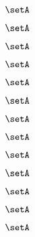 \begin{forslides}
    \begin{equation}
        \label{eq:slides-processes-113}
        \setA
    \end{equation}

    \begin{equation}
        \label{eq:slides-processes-114}
        \setA
    \end{equation}

    \begin{equation}
        \label{eq:slides-processes-115}
        \setA
    \end{equation}

    \begin{equation}
        \label{eq:slides-processes-116}
        \setA
    \end{equation}

    \begin{equation}
        \label{eq:slides-processes-117}
        \setA
    \end{equation}

    \begin{equation}
        \label{eq:slides-processes-118}
        \setA
    \end{equation}

    \begin{equation}
        \label{eq:slides-processes-119}
        \setA
    \end{equation}

    \begin{equation}
        \label{eq:slides-processes-120}
        \setA
    \end{equation}

    \begin{equation}
        \label{eq:slides-processes-121}
        \setA
    \end{equation}

    \begin{equation}
        \label{eq:slides-processes-122}
        \setA
    \end{equation}

    \begin{equation}
        \label{eq:slides-processes-123}
        \setA
    \end{equation}

    \begin{equation}
        \label{eq:slides-processes-124}
        \setA
    \end{equation}

    \begin{equation}
        \label{eq:slides-processes-125}
        \setA
    \end{equation}


\end{forslides}
